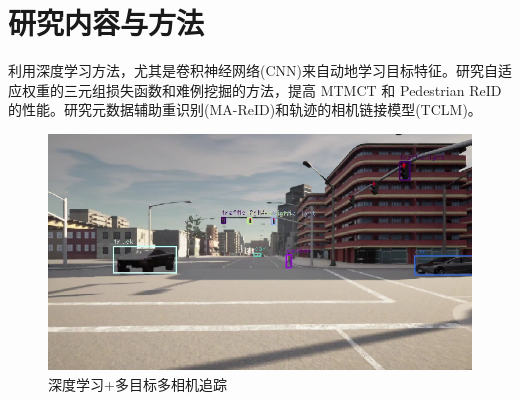 \section{研究内容与方法}

利用深度学习方法，尤其是卷积神经网络(CNN)来自动地学习目标特征。研究自适应权重的三元组损失函数和难例挖掘的方法，提高 MTMCT 和 Pedestrian ReID 的性能。研究元数据辅助重识别(MA-ReID)和轨迹的相机链接模型(TCLM)。

\begin{figure}[htbp] %
	\centering
	\includegraphics[width=1.0\textwidth]{p26} %
	\caption{深度学习+多目标多相机追踪} %
	\label{fig:p26} %
\end{figure}

